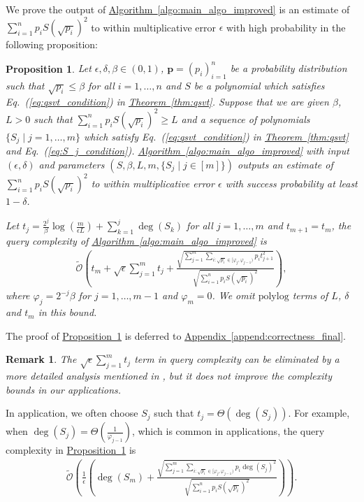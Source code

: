 \documentclass[journal]{IEEEtran}
\newtheorem{proposition}{Proposition}
\newtheorem{remark}{Remark}
\newcommand{\eq}[1]{Eq.~(\ref{eq:#1})}
\newcommand{\thm}[1]{\hyperref[thm:#1]{Theorem~\ref*{thm:#1}}}
\newcommand{\prop}[1]{\hyperref[prop:#1]{Proposition~\ref*{prop:#1}}}
\newcommand{\algo}[1]{\hyperref[algo:#1]{Algorithm~\ref*{algo:#1}}}
\newcommand{\append}[1]{\hyperref[append:#1]{Appendix~\ref*{append:#1}}}
\begin{document}
We prove the output of \algo{main_algo_improved} is an estimate of $\sum_{i=1}^n p_i S(\sqrt{p_i})^2$ to within multiplicative error $\epsilon$ with high probability in the following proposition:
\begin{proposition}
\label{prop:correctness_final}
  Let $\epsilon, \delta, \beta \in(0,1)$, $\mathbf{p} = (p_i)_{i = 1}^n$ be a probability distribution such that $\sqrt{p_i}\le \beta$ for all $i = 1,\ldots,n$ and $S$ be a polynomial which satisfies \eq{qsvt_condition} in \thm{qsvt}. Suppose that we are given $\beta$, $L > 0$ such that $\sum_{i = 1}^n p_i S(\sqrt{p_i})^2 \ge L$ and a sequence of polynomials $\{S_j\mid j = 1,\ldots,m\}$ which satisfy \eq{qsvt_condition} in \thm{qsvt} and \eq{S_j_condition}. \algo{main_algo_improved} with input $(\epsilon,\delta)$ and parameters $(S, \beta,L,m,\{S_j\mid j\in[m]\})$ outputs an estimate of $\sum_{i=1}^n p_i S(\sqrt{p_i})^2$ to within multiplicative error $\epsilon$ with success probability at least $1-\delta$.

  Let $t_j = \frac{2^{j}}{\beta}\log(\frac{m}{\epsilon L}) + \sum_{k = 1}^{j}\deg(S_k)$ for all $j = 1,\ldots,m$ and $t_{m+1} = t_m$, the query complexity of \algo{main_algo_improved} is
  \begin{align}
    \widetilde{\mathcal{O}}\left(t_m + \sqrt{\epsilon} \sum_{j=1}^m t_j + \frac{\sqrt{\sum_{j = 1}^m\sum_{i:\sqrt{p_i}\in[\varphi_j,\varphi_{j-1})}p_i t_{j+1}^2}}{\sqrt{\sum_{i = 1}^np_iS(\sqrt{p_i})^2}}\right),
  \end{align}
  where $\varphi_j = 2^{-j}\beta$ for $j = 1,\ldots,m-1$ and $\varphi_m = 0$. We omit $\mathrm{polylog}$ terms of $L$, $\delta$ and $t_m$ in this bound. 
\end{proposition}
The proof of \prop{correctness_final} is deferred to \append{correctness_final}.

\begin{remark}
The $\sqrt{\epsilon}\sum_{j=1}^{m} t_j$ term in query complexity can be eliminated by a more detailed analysis mentioned in \cite{childs2017}, but it does not improve the complexity bounds in our applications.
\end{remark}

\iffalse
In application, we often choose $S_j$ such that $t_j = \Theta(\deg(S_j))$. For example, when $\deg(S_j) = \Theta \left(\frac{1}{\varphi_{j-1}}\right)$, which is common in applications, the query complexity in \prop{correctness_final} is
\begin{align}
    \label{eq:simple_query_complexity}
    \widetilde{\mathcal{O}}\left(\frac{1}{\epsilon}\left(\deg(S_m) + \frac{\sqrt{\sum_{j = 1}^m\sum_{i:\sqrt{p_i}\in[\varphi_j,\varphi_{j-1})}p_i \deg(S_j)^2}}{\sqrt{\sum_{i = 1}^np_iS(\sqrt{p_i})^2}}\right)\right).
\end{align}
\end{document}
